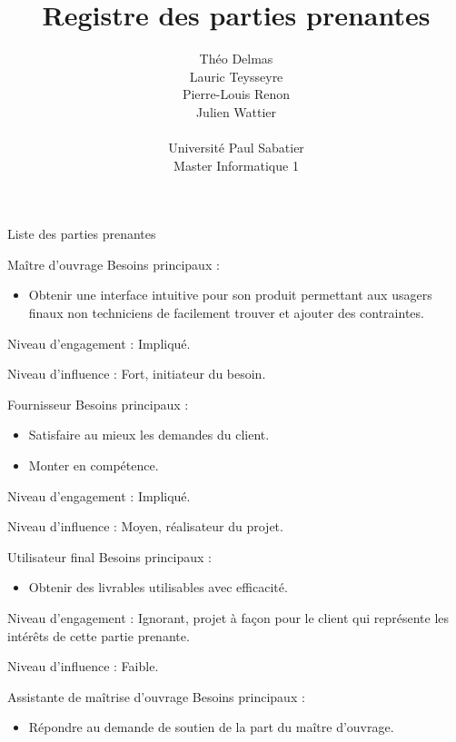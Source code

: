 \documentclass[]{article}
\title{Registre des parties prenantes}
\author{
    Théo Delmas\\
    Lauric Teysseyre\\
    Pierre-Louis Renon\\
    Julien Wattier\\
    \\
    Université Paul Sabatier\\
    Master Informatique 1\\
   }
\date{}
\begin{document}
\maketitle
\newpage
\tableofcontents
\newpage


\begin{section}{Liste des parties prenantes}

    \begin{subsection}{Maître d'ouvrage}
        Besoins principaux : 
        \begin{itemize}
            \item Obtenir une interface intuitive pour son produit permettant aux usagers finaux non techniciens de facilement trouver et ajouter des contraintes.
        \end{itemize}

        Niveau d'engagement : Impliqué.

        Niveau d'influence : Fort, initiateur du besoin.
    \end{subsection}

    \begin{subsection}{Fournisseur}
        Besoins principaux : 
        \begin{itemize}
            \item Satisfaire au mieux les demandes du client.
            \item Monter en compétence.
        \end{itemize}

        Niveau d'engagement : Impliqué.

        Niveau d'influence : Moyen, réalisateur du projet.
    \end{subsection}

    \begin{subsection}{Utilisateur final}
        Besoins principaux : 
        \begin{itemize}
            \item Obtenir des livrables utilisables avec efficacité.
        \end{itemize}

        Niveau d'engagement : Ignorant, projet à façon pour le client qui représente les intérêts de cette partie prenante.

        Niveau d'influence : Faible.
    \end{subsection}

    \begin{subsection}{Assistante de maîtrise d'ouvrage}
        Besoins principaux : 
        \begin{itemize}
            \item Répondre au demande de soutien de la part du maître d'ouvrage.
        \end{itemize}


\end{subsection}
\end{section}
\end{document}
